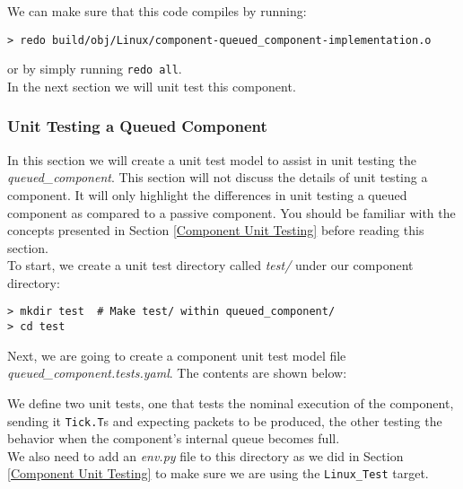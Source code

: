 We can make sure that this code compiles by running:

\vspace{5mm} %
\begin{verbatim}
> redo build/obj/Linux/component-queued_component-implementation.o
\end{verbatim}
\vspace{5mm} %

or by simply running \texttt{redo all}. \\

In the next section we will unit test this component.

\subsubsection{Unit Testing a Queued Component} \label{Unit Testing a Queued Component}

In this section we will create a unit test model to assist in unit testing the \textit{queued\_component}. This section will not discuss the details of unit testing a component. It will only highlight the differences in unit testing a queued component as compared to a passive component. You should be familiar with the concepts presented in Section \ref{Component Unit Testing} before reading this section. \\

To start, we create a unit test directory called \textit{test/} under our component directory:

\vspace{5mm} %
\begin{verbatim}
> mkdir test  # Make test/ within queued_component/
> cd test
\end{verbatim}
\vspace{5mm} %

Next, we are going to create a component unit test model file \textit{queued\_component.tests.yaml}. The contents are shown below:


We define two unit tests, one that tests the nominal execution of the component, sending it \texttt{Tick.T}s and expecting packets to be produced, the other testing the behavior when the component's internal queue becomes full. \\

We also need to add an \textit{env.py} file to this directory as we did in Section \ref{Component Unit Testing} to make sure we are using the \texttt{Linux\_Test} target. \\

